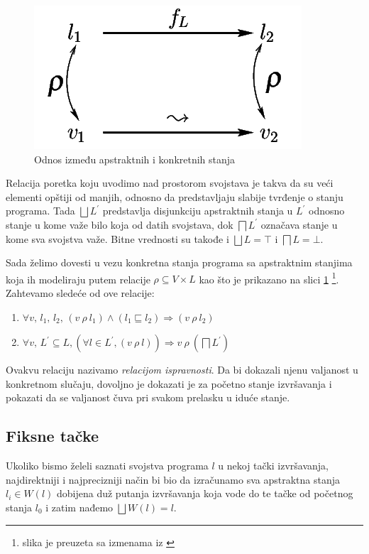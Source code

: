 \begin{figure}
\begin{center}
\includegraphics[scale=0.5]{Rho.png}
\end{center}
\caption{Odnos između apstraktnih i konkretnih stanja}
\label{fig:Rho}
\end{figure}

Relacija poretka koju uvodimo nad prostorom svojstava je takva da su veći elementi opštiji od manjih, odnosno da predstavljaju slabije tvrđenje o stanju programa. Tada $\bigsqcup L^{\prime}$ predstavlja disjunkciju apstraktnih stanja u $L^{\prime}$ odnosno stanje u kome važe bilo koja od datih svojstava, dok $\bigsqcap L^{\prime}$ označava stanje u kome sva svojstva važe. Bitne vrednosti su takođe i $\bigsqcup L = \top$ i $\bigsqcap L = \bot$.

Sada želimo dovesti u vezu konkretna stanja programa sa apstraktnim stanjima koja ih modeliraju putem relacije $\rho \subseteq V \times L$ kao što je prikazano na slici \ref{fig:Rho} \footnote{slika je preuzeta sa izmenama iz \cite{salcianu}}. Zahtevamo sledeće od ove relacije:
\begin{enumerate}
\item $\forall v,\, l_{1},\, l_{2},\, (v\: \rho \: l_{1}) \wedge (l_{1} \sqsubseteq l_{2}) \Rightarrow (v\: \rho \: l_{2})$
\item $\forall v,\, L^{\prime} \subseteq L, (\forall l \in L^{\prime}, 	(v\: \rho \: l)) \Rightarrow v\: \rho \: (\bigsqcap L^{\prime})$
\end{enumerate}

Ovakvu relaciju nazivamo \emph{relacijom ispravnosti}. Da bi dokazali njenu valjanost u konkretnom slučaju, dovoljno je dokazati je za početno stanje izvršavanja i pokazati da se valjanost čuva pri svakom prelasku u iduće stanje. 


\subsection{Fiksne tačke}
Ukoliko bismo želeli saznati svojstva programa $l$ u nekoj tački izvršavanja, najdirektniji i najprecizniji način bi bio da izračunamo sva apstraktna stanja $l_{i} \in W(l)$ dobijena duž putanja izvršavanja koja vode do te tačke od početnog stanja $l_{0}$ i zatim nađemo $\bigsqcup W(l) = l$. 


